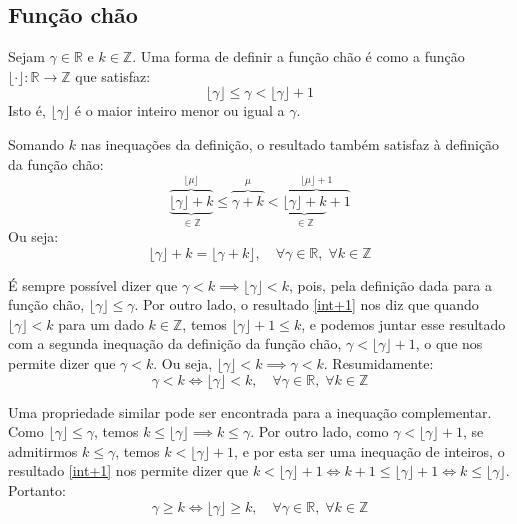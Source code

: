 \subsection*{Função chão}

Sejam $\gamma \in \mathds{R}$ e $k \in \mathds{Z}$.
Uma forma de definir a função chão
é como a função $\lfloor \cdot \rfloor : \mathds{R} \to \mathds{Z}$
que satisfaz:
\begin{equation}\tag{Chão}
  \lfloor \gamma \rfloor \le \gamma < \lfloor \gamma \rfloor + 1
\end{equation}
Isto é,
$\lfloor \gamma \rfloor$ é o maior inteiro menor ou igual a $\gamma$.

Somando $k$ nas inequações da definição,
o resultado também satisfaz à definição da função chão:
\[
  \overbrace{
    \underbrace{\lfloor \gamma \rfloor + k}_{\in \mathds{Z}}
  }^{\lfloor \mu \rfloor}
  \le \overbrace{\gamma + k}^{\mu} <
  \overbrace{
    \underbrace{\lfloor \gamma \rfloor + k}_{\in \mathds{Z}} + 1
  }^{\lfloor \mu \rfloor + 1}
\]
Ou seja:
\begin{equation}\label{floor-int}
  \lfloor \gamma \rfloor + k = \lfloor \gamma + k \rfloor,
  \quad \forall \gamma \in \mathds{R}, \; \forall k \in \mathds{Z}
\end{equation}

É sempre possível dizer que
$\gamma < k \implies \lfloor \gamma \rfloor < k$,
pois, pela definição dada para a função chão,
$\lfloor \gamma \rfloor \le \gamma$.
Por outro lado,
o resultado \eqref{int+1} nos diz que
quando $\lfloor \gamma \rfloor < k$ para um dado $k \in \mathds{Z}$,
temos $\lfloor \gamma \rfloor + 1 \le k$,
e podemos juntar esse resultado
com a segunda inequação da definição da função chão,
$\gamma < \lfloor \gamma \rfloor + 1$,
o que nos permite dizer que $\gamma < k$.
Ou seja, $\lfloor \gamma \rfloor < k \implies \gamma < k$.
Resumidamente:
\begin{equation}\label{floor-switch-lt}
  \gamma < k \iff \lfloor \gamma \rfloor < k,
  \quad \forall \gamma \in \mathds{R}, \; \forall k \in \mathds{Z}
\end{equation}

Uma propriedade similar pode ser encontrada
para a inequação complementar.
Como $\lfloor \gamma \rfloor \le \gamma$,
temos $k \le \lfloor \gamma \rfloor \implies k \le \gamma$.
Por outro lado,
como $\gamma < \lfloor \gamma \rfloor + 1$,
se admitirmos $k \le \gamma$,
temos $k < \lfloor \gamma \rfloor + 1$,
e por esta ser uma inequação de inteiros,
o resultado \eqref{int+1} nos permite dizer que
$k < \lfloor \gamma \rfloor + 1 \iff
 k + 1 \le \lfloor \gamma \rfloor + 1 \iff
 k \le \lfloor \gamma \rfloor$.
Portanto:
\begin{equation}\label{floor-switch-ge}
  \gamma \ge k \iff \lfloor \gamma \rfloor \ge k,
  \quad \forall \gamma \in \mathds{R}, \; \forall k \in \mathds{Z}
\end{equation}

